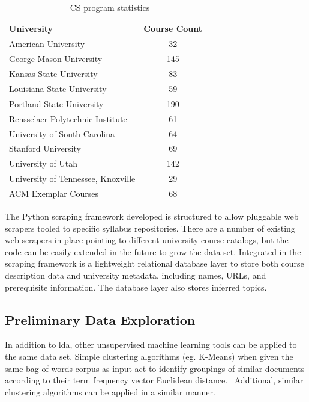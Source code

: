
\begin{table}
  \centering
  \begin{tabular}{lcl}
    \toprule
    University & Course Count \\
    \midrule
    American University & 32 \\
    George Mason University & 145 \\
    Kansas State University & 83 \\
    Louisiana State University & 59 \\
    Portland State University & 190 \\
    Rensselaer Polytechnic Institute & 61 \\
    University of South Carolina & 64 \\
    Stanford University & 69 \\
    University of Utah & 142 \\
    University of Tennessee, Knoxville & 29 \\
    \midrule
    ACM Exemplar Courses & 68 \\
    \bottomrule
  \end{tabular}
  \caption{CS program statistics\label{tbl:dataset}}
\end{table}


The Python scraping framework developed is structured to allow pluggable web scrapers tooled to specific syllabus repositories.
There are a number of existing web scrapers in place pointing to different university course catalogs, but the code can be easily extended in the future to grow the data set.
Integrated in the scraping framework is a lightweight relational database layer to store both course description data and university metadata, including names, URLs, and prerequisite information.
The database layer also stores inferred topics.


\subsection{Preliminary Data Exploration}
\label{sec:data-exploration}


In addition to \ac{lda}, other unsupervised machine learning tools can be applied to the same data set.
Simple clustering algorithms (eg. K-Means) when given the same bag of words corpus as input act to identify groupings of similar documents according to their term frequency vector Euclidean distance.~\cite{lloyd1982}
Additional, similar clustering algorithms can be applied in a similar manner.

